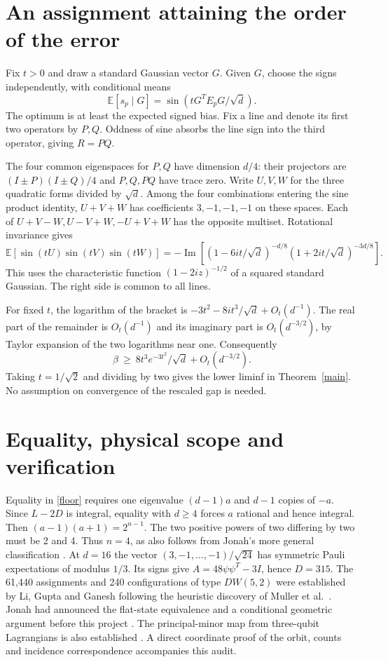 \documentclass[11pt]{article}
\begin{document}
\section{An assignment attaining the order of the error}
Fix $t>0$ and draw a standard Gaussian vector $G$. Given $G$, choose the signs independently, with conditional means
\[
  \mathbb E[s_p\mid G]=\sin\!\left(t G^TE_pG/\sqrt d\right).
\] The optimum is at least the expected signed bias. Fix a line and denote its first two operators by $P,Q$. Oddness of sine absorbs the line sign into the third operator, giving $R=PQ$.

The four common eigenspaces for $P,Q$ have dimension $d/4$: their projectors are $(I\pm P)(I\pm Q)/4$ and $P,Q,PQ$ have trace zero. Write $U,V,W$ for the three quadratic forms divided by $\sqrt d$. Among the four combinations entering the sine product identity, $U+V+W$ has coefficients $3,-1,-1,-1$ on these spaces. Each of $U+V-W,U-V+W,-U+V+W$ has the opposite multiset. Rotational invariance gives
\[
 \mathbb E[\sin(tU)\sin(tV)\sin(tW)]
 =-\operatorname{Im}\left[
 (1-6it/\sqrt d)^{-d/8}(1+2it/\sqrt d)^{-3d/8}
 \right].
\]
This uses the characteristic function $(1-2iz)^{-1/2}$ of a squared standard Gaussian. The right side is common to all lines.

For fixed $t$, the logarithm of the bracket is $-3t^2-8it^3/\sqrt d+O_t(d^{-1})$. The real part of the remainder is $O_t(d^{-1})$ and its imaginary part is $O_t(d^{-3/2})$, by Taylor expansion of the two logarithms near one. Consequently
\[
 \beta\ \ge\ 8t^3e^{-3t^2}/\sqrt d+O_t(d^{-3/2}).
\]
Taking $t=1/\sqrt2$ and dividing by two gives the lower liminf in Theorem~\ref{main}. No assumption on convergence of the rescaled gap is needed.

\section{Equality, physical scope and verification}
Equality in \eqref{floor} requires one eigenvalue $(d-1)a$ and $d-1$ copies of $-a$. Since $L-2D$ is integral, equality with $d\ge4$ forces $a$ rational and hence integral. Then $(a-1)(a+1)=2^{n-1}$. The two positive powers of two differing by two must be 2 and 4. Thus $n=4$, as also follows from Jonah's more general classification \cite[Thm.~8]{structure}. At $d=16$ the vector $(3,-1,\dots,-1)/\sqrt{24}$ has symmetric Pauli expectations of modulus $1/3$. Its signs give $A=48\psi\psi^T-3I$, hence $D=315$. The 61,440 assignments and 240 configurations of type $DW(5,2)$ were established by Li, Gupta and Ganesh following the heuristic discovery of Muller et al.\ \cite{lgg,muller}. Jonah had announced the flat-state equivalence and a conditional geometric argument before this project \cite{digest}. The principal-minor map from three-qubit Lagrangians is also established \cite{plucker}. A direct coordinate proof of the orbit, counts and incidence correspondence accompanies this audit.
\end{document}
